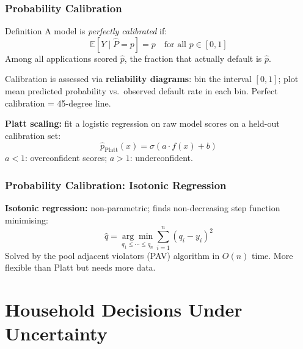 \documentclass[9pt,t]{beamer}
\begin{document}
\begin{frame}
\frametitle{Probability Calibration}

\begin{block}{Definition}
  A model is \emph{perfectly calibrated} if:
  \[
    \mathbb{E}[Y \mid \hat{P} = p] = p \quad \text{for all } p \in [0, 1]
  \]
  Among all applications scored $\hat{p}$, the fraction that actually default is $\hat{p}$.
\end{block}

Calibration is assessed via \textbf{reliability diagrams}: bin the interval $[0,1]$; plot mean
predicted probability vs.\ observed default rate in each bin. Perfect calibration = 45-degree line.

\medskip
\textbf{Platt scaling:} fit a logistic regression on raw model scores on a held-out calibration set:
\[
  \hat{p}_{\text{Platt}}(x) = \sigma(a \cdot f(x) + b)
\]
$a < 1$: overconfident scores; $a > 1$: underconfident.
\end{frame}

\begin{frame}
\frametitle{Probability Calibration: Isotonic Regression}

\textbf{Isotonic regression:} non-parametric; finds non-decreasing step function minimising:
\[
  \hat{q} = \underset{q_1 \leq \cdots \leq q_n}{\arg\min} \sum_{i=1}^{n} (q_i - y_i)^2
\]
Solved by the pool adjacent violators (PAV) algorithm in $O(n)$ time. More flexible than Platt
but needs more data.
\end{frame}

\section{Household Decisions Under Uncertainty}
\end{document}
